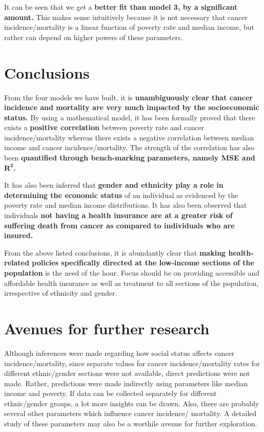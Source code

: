 \documentclass[conference]{IEEEtran}
\begin{document}
It can be seen that we get a \textbf{better fit than model 3, by a significant amount.} This makes sense intuitively because it is not necessary that cancer incidence/mortality is a linear function of poverty rate and median income, but rather can depend on higher powers of these parameters.



\section{Conclusions}

From the four models we have built, it is \textbf{unambiguously clear that cancer incidence and mortality are very much impacted by the socioeconomic status.} By using a mathematical model, it has been formally proved that there exists a \textbf{positive correlation} between poverty rate and cancer incidence/mortality whereas there exists a negative correlation between median income and cancer incidence/mortality. The strength of the correlation has also been \textbf{quantified through bench-marking parameters, namely MSE and $\mathbf{R^2}$.}

It has also been inferred that \textbf{gender and ethnicity play a role in determining the economic status} of an individual as evidenced by the poverty rate and median income distributions. It has also been observed that individuals \textbf{not having a health insurance are at a greater risk of suffering death from cancer as compared to individuals who are insured.}

From the above listed conclusions, it is abundantly clear that \textbf{making health-related policies specifically directed at the low-income sections of the population} is the need of the hour. Focus should be on providing accessible and affordable health insurance as well as treatment to all sections of the population, irrespective of ethnicity and gender.



\section{Avenues for further research}

Although inferences were made regarding how social status affects cancer incidence/mortality, since separate values for cancer incidence/mortality rates for different ethnic/gender sections were not available, direct predictions were not made. Rather, predictions were made indirectly using parameters like median income and poverty. If data can be collected separately for different ethnic/gender groups, a lot more insights can be drawn. Also, there are probably several other parameters which influence cancer incidence/ mortality. A detailed study of these parameters may also be a worthile avenue for further exploration.




\nocite{*} %

\end{document}
